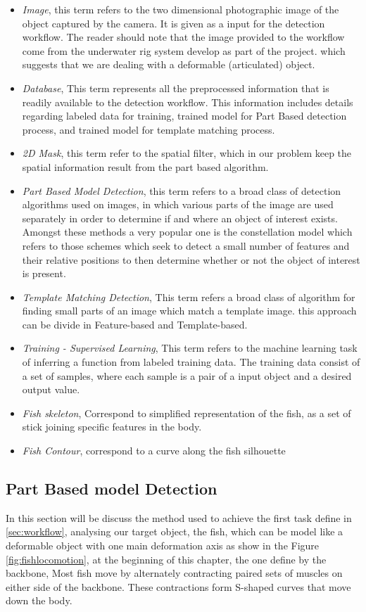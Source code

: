 \begin{itemize}
\item \textit{Image}, this term refers to the two dimensional photographic image of the object
captured by the camera. It is given as a input for the detection workflow. The reader 
should note that the image provided to the workflow come from the underwater rig system
develop as part of the project.
which suggests that we are dealing with a deformable (articulated) object.
\item \textit{Database}, This term represents all the preprocessed information that 
is readily available to the detection workflow. This information includes details
regarding labeled data for training, trained model for Part Based detection process,
and trained model for template matching process.
\item \textit{2D Mask}, this term refer to the spatial filter, which in our problem
keep the spatial information result from the part based algorithm.
\item \textit{Part Based Model Detection}, this term refers to a broad class of 
detection algorithms used on images, in which various parts of the image are used 
separately in order to determine if and where an object of interest exists. 
Amongst these methods a very popular one is the constellation model which refers 
to those schemes which seek to detect a small number of features and their relative 
positions to then determine whether or not the object of interest is present. 
\item \textit{Template Matching Detection}, This term refers a broad class of algorithm
for finding small parts of an image which match a template image. this approach can be divide in
Feature-based and Template-based.
\item \textit{Training - Supervised Learning}, This term refers to the machine learning task
of inferring a function from labeled training data. The training data consist of a set of samples, 
where each sample is a pair of a input object and a desired output value.
\item \textit{Fish skeleton}, Correspond to simplified representation of the fish, as a set
of stick joining specific features in the body.
\item \textit{Fish Contour}, correspond to a curve along the fish silhouette
\end{itemize}

\subsection{Part Based model Detection}
In this section will be discuss the method used to achieve the first task define in \ref{sec:workflow},
analysing our target object, the fish, which can be model like a deformable object 
with one main deformation axis as show in the Figure \ref{fig:fishlocomotion}, at the beginning
of this chapter, the one define by the backbone, Most fish move by alternately contracting paired
sets of muscles on either side of the backbone. These contractions form S-shaped curves that move down the body.


